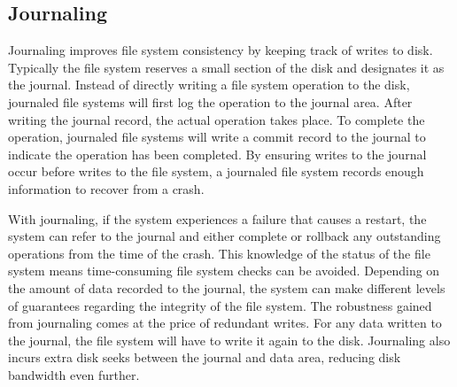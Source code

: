 \subsection{Journaling}
\label{sec:journaling}

Journaling improves file system consistency by keeping track of writes to
disk. Typically the file system reserves a small section of the disk and
designates it as the journal. Instead of directly writing a file system
operation to the disk, journaled file systems will first log the operation to
the journal area. After writing the journal record, the actual operation takes
place. To complete the operation, journaled file systems will write a commit
record to the journal to indicate the operation has been completed. By
ensuring writes to the journal occur before writes to the file system, a
journaled file system records enough information to recover from a crash.

With journaling, if the system experiences a failure that causes a restart,
the system can refer to the journal and either complete or rollback any
outstanding operations from the time of the crash. This knowledge of the
status of the file system means time-consuming file system checks can be
avoided. Depending on the amount of data recorded to the journal, the system
can make different levels of guarantees regarding the integrity of the file
system.
The robustness gained from journaling comes at the price of redundant writes.
For any data written to the journal, the file system will have to write it
again to the disk. Journaling also incurs extra disk seeks between the journal
and data area, reducing disk bandwidth even further.



